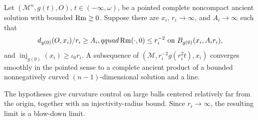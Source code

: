 \begin{theorem}
\label{thm:chow-iii-dimension-reduction-one}

Let \((\mathcal M^n,g(t),O)\), \(t\in(-\infty,\omega)\), be a pointed complete
noncompact ancient solution with bounded \(\operatorname{Rm}\ge0\).  Suppose there are
\(x_i\), \(r_i\to\infty\), and \(A_i\to\infty\) such that
\[
 d_{g(0)}(O,x_i)/r_i\ge A_i,qquad
 \operatorname{Rm}(\cdot,0)\le r_i^{-2}\ \text{on }B_{g(0)}(x_i,A_ir_i),
\]
and \(\operatorname{inj}_{g(0)}(x_i)\ge\iota_0r_i\).  A subsequence of
\((\mathcal M,r_i^{-2}g(r_i^2t),x_i)\) converges smoothly in the pointed sense
to a complete ancient product of a bounded nonnegatively curved
\((n-1)\)-dimensional solution and a line.
\end{theorem}

\begin{remark}
\label{rem:chow-iii-dimension-reduction-one-interpretation}


The hypotheses give curvature control on large balls centered relatively far
from the origin, together with an injectivity-radius bound.  Since
\(r_i\to\infty\), the resulting limit is a blow-down limit.
\end{remark}


